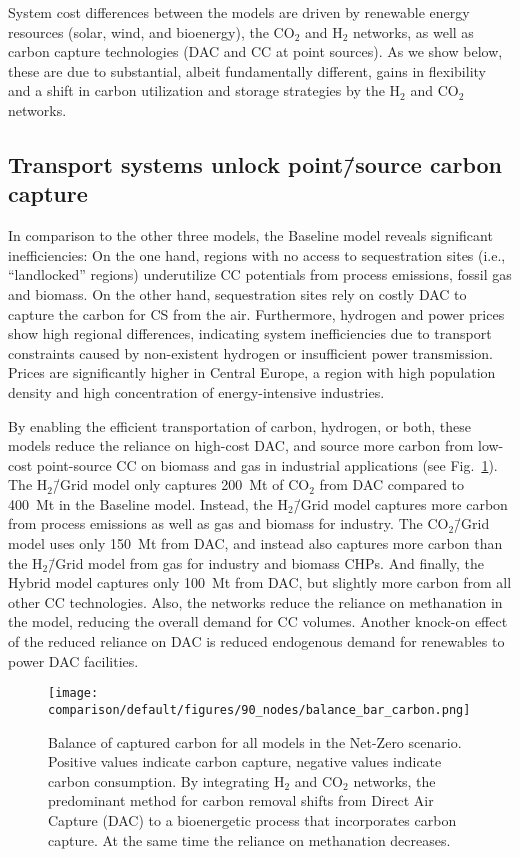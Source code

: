 \documentclass[twocolumn]{article}
\newcommand{\COtwo}{CO$_2$}
\newcommand{\Htwo}{H$_2$}
\newcommand{\modBase}{Baseline model}
\newcommand{\modCO}{CO$_2$\=/Grid model}
\newcommand{\modH}{H$_2$\=/Grid model}
\newcommand{\modHybrid}{Hybrid model}
\begin{document}
System cost differences between the models are driven by renewable energy resources (solar, wind, and bioenergy), the \COtwo{} and \Htwo{} networks, as well as carbon capture technologies (DAC and CC at point sources).
As we show below, these are due to substantial, albeit fundamentally different, gains in flexibility and a shift in carbon utilization and storage strategies by the \Htwo{} and \COtwo{} networks.

\subsection*{Transport systems unlock point\=/source carbon capture}

In comparison to the other three models, the \modBase{} reveals significant inefficiencies: On the one hand, regions with no access to sequestration sites (i.e., ``landlocked'' regions) underutilize CC potentials from process emissions, fossil gas and biomass. On the other hand, sequestration sites rely on costly DAC to capture the carbon for CS from the air. Furthermore, hydrogen and power prices show high regional differences, indicating system inefficiencies due to transport constraints caused by non-existent hydrogen or insufficient power transmission. Prices are significantly higher in Central Europe, a region with high population density and high concentration of energy-intensive industries.

By enabling the efficient transportation of carbon, hydrogen, or both, these models reduce the reliance on high-cost DAC, and source more carbon from low-cost point-source CC on biomass and gas in industrial applications (see Fig.~\ref{fig:balance_captured_carbon}). The \modH{} only captures \label{}200~Mt of \COtwo{} from DAC compared to \label{}400~Mt in the \modBase{}. Instead, the \modH{} captures more carbon from process emissions as well as gas and biomass for industry. The \modCO{} uses only \label{}150~Mt from DAC, and instead also captures more carbon than the \modH{} from gas for industry and biomass CHPs. And finally, the \modHybrid{} captures only \label{}100~Mt from DAC, but slightly more carbon from all other CC technologies.
Also, the networks reduce the reliance on methanation in the model, reducing the overall demand for CC volumes. Another knock-on effect of the reduced reliance on DAC is reduced endogenous demand for renewables to power DAC facilities.


\begin{figure}[ht!]
    \centering
    \texttt{[image: comparison/default/figures/90\_nodes/balance\_bar\_carbon.png]}
    \caption{Balance of captured carbon for all models in the Net-Zero scenario. Positive values indicate carbon capture, negative values indicate carbon consumption. By integrating \Htwo{} and \COtwo{} networks, the predominant method for carbon removal shifts from Direct Air Capture (DAC) to a bioenergetic process that incorporates carbon capture. At the same time the reliance on methanation decreases.}
    \label{fig:balance_captured_carbon}
\end{figure}
\end{document}
